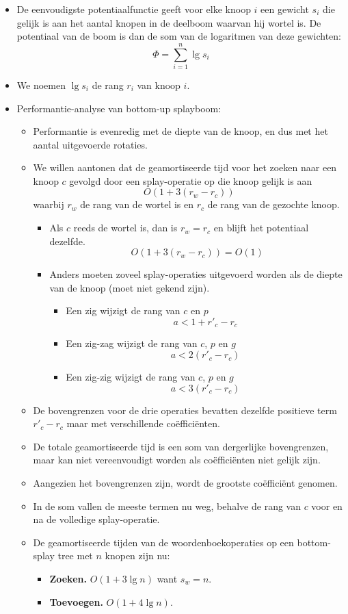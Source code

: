 \begin{itemize}
    \item De eenvoudigste potentiaalfunctie geeft voor elke knoop $i$ een gewicht $s_i$ die gelijk is aan het aantal knopen in de deelboom waarvan hij wortel is. De potentiaal van de boom is dan de som van de logaritmen van deze gewichten:
    $$\Phi = \sum_{i=1}^n \lg s_i$$
    \item We noemen $\lg s_i$ de rang $r_i$ van knoop $i$.
    \item Performantie-analyse van bottom-up splayboom:
    \begin{itemize}
        \item Performantie is evenredig met de diepte van de knoop, en dus met het aantal uitgevoerde rotaties.
        \item We willen aantonen dat de geamortiseerde tijd voor het zoeken naar een knoop $c$ gevolgd door een splay-operatie op die knoop gelijk is aan $$O(1 + 3(r_w - r_c))$$
        waarbij $r_w$ de rang van de wortel is en $r_c$ de rang van de gezochte knoop.
        \begin{itemize}
            \item Als $c$ reeds de wortel is, dan is $r_w = r_c$ en blijft het potentiaal dezelfde.
            $$O(1 + 3(r_w - r_c)) = O(1)$$
            \item Anders moeten zoveel splay-operaties uitgevoerd worden als de diepte van de knoop (moet niet gekend zijn).
            \begin{itemize}
                \item Een zig wijzigt de rang van $c$ en $p$
                $$a < 1 + r'_c - r_c$$

                \item Een zig-zag wijzigt de rang van $c$, $p$ en $g$
                $$a < 2(r'_c - r_c)$$

                \item Een zig-zig wijzigt de rang van $c$, $p$ en $g$
                $$a <3(r'_c - r_c)$$ 
            \end{itemize}
        \end{itemize}
        \item De bovengrenzen voor de drie operaties bevatten dezelfde positieve term $r'_c - r_c$ maar met verschillende coëfficiënten.
        \item De totale geamortiseerde tijd is een som van dergerlijke bovengrenzen, maar kan niet vereenvoudigt worden als coëfficiënten niet gelijk zijn.
        \item Aangezien het bovengrenzen zijn, wordt de grootste coëfficiënt genomen.
        \item In de som vallen de meeste termen nu weg, behalve de rang van $c$ voor en na de volledige splay-operatie.
        \item De geamortiseerde tijden van de woordenboekoperaties op een bottom-splay tree met $n$ knopen zijn nu:
        \begin{itemize}
            \item \textbf{Zoeken.} $O(1 + 3\lg n)$ want $s_w = n$.
            \item \textbf{Toevoegen.} $O(1 + 4\lg n)$.


\end{itemize}
\end{itemize}
\end{itemize}
